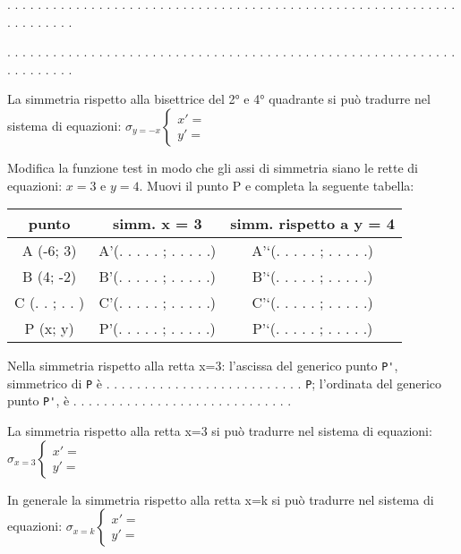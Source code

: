 . . . . . . . . . . . . . . . . . . . . . . . . . . . . . . . . . . . . . . . .
. . . . . . . . . . . . . . . . . . . . . . . . . . . .

. . . . . . . . . . . . . . . . . . . . . . . . . . . . . . . . . . . . . . . .
. . . . . . . . . . . . . . . . . . . . . . . . . . . .

La simmetria rispetto alla bisettrice del 2° e 4° quadrante si può tradurre
nel sistema di equazioni:
\(\sigma_{y = -x} \left \{
\begin{array}{l}
x' = {} \\
y' = {}
\end{array} \right .\)

Modifica la funzione test in modo che gli assi di simmetria siano le rette di
equazioni: \(x=3\) e \(y=4\).
Muovi il punto P e completa la seguente tabella:

\begin{center}\begin{tabular}{|c|c|c|}
\hline

punto
 & 
simm. x = 3
 & 
simm. rispetto a y = 4
\\
\hline
A (-6; 3)
 & 
A'(. . . . . ; . . . . .)
 & 
A'`(. . . . . ; . . . . .)
\\
\hline
B (4; -2)
 & 
B'(. . . . . ; . . . . .)
 & 
B'`(. . . . . ; . . . . .)
\\
\hline
C (. . ; . . )
 & 
C'(. . . . . ; . . . . .)
 & 
C'`(. . . . . ; . . . . .)
\\
\hline
P (x; y)
 & 
P'(. . . . . ; . . . . .)
 & 
P'`(. . . . . ; . . . . .)
\\
\hline\end{tabular}\end{center}

Nella simmetria rispetto alla retta x=3:
l'ascissa del generico punto \lstinline{P'}, 
simmetrico di \lstinline{P} 
è . . . . . . . . . . . . . . . . . . . . . . . . . .
\lstinline{P}; 
l'ordinata del generico punto \lstinline{P'}, 
è . . . . . . . . . . . . . . . . . . . . . . . . . . . . .

La simmetria rispetto alla retta x=3 si può tradurre nel sistema di equazioni:
\(\sigma_{x = 3} \left \{
\begin{array}{l}
x' = {} \\
y' = {}
\end{array} \right .\)

In generale la simmetria rispetto alla retta x=k si può tradurre nel sistema
di equazioni:
\(\sigma_{x = k} \left \{
\begin{array}{l}
x' = {} \\
y' = {}
\end{array} \right .\)

